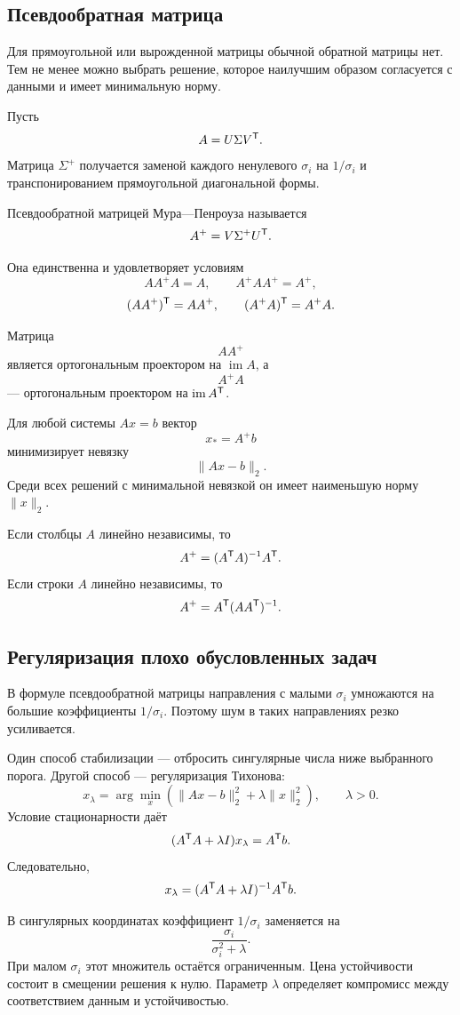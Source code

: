 \subsection{Псевдообратная матрица}

Для прямоугольной или вырожденной матрицы обычной обратной матрицы нет. Тем не менее можно выбрать решение, которое наилучшим образом согласуется с данными и имеет минимальную норму.

Пусть
\[
A=U\Sigma V^{\mathsf{T}}.
\]
Матрица \(\Sigma^+\) получается заменой каждого ненулевого \(\sigma_i\) на \(1/\sigma_i\) и транспонированием прямоугольной диагональной формы.

\begin{definition}
Псевдообратной матрицей Мура---Пенроуза называется
\[
A^+=V\Sigma^+U^{\mathsf{T}}.
\]
\end{definition}

Она единственна и удовлетворяет условиям
\[
AA^+A=A,
\qquad
A^+AA^+=A^+,
\]
\[
(AA^+)^{\mathsf{T}}=AA^+,
\qquad
(A^+A)^{\mathsf{T}}=A^+A.
\]

Матрица
\[
AA^+
\]
является ортогональным проектором на \(\operatorname{im}A\), а
\[
A^+A
\]
--- ортогональным проектором на \(\operatorname{im}A^{\mathsf{T}}\).

Для любой системы \(Ax=b\) вектор
\[
x_*=A^+b
\]
минимизирует невязку
\[
\|Ax-b\|_2.
\]
Среди всех решений с минимальной невязкой он имеет наименьшую норму \(\|x\|_2\).

Если столбцы \(A\) линейно независимы, то
\[
A^+=(A^{\mathsf{T}}A)^{-1}A^{\mathsf{T}}.
\]
Если строки \(A\) линейно независимы, то
\[
A^+=A^{\mathsf{T}}(AA^{\mathsf{T}})^{-1}.
\]

\subsection{Регуляризация плохо обусловленных задач}

В формуле псевдообратной матрицы направления с малыми \(\sigma_i\) умножаются на большие коэффициенты \(1/\sigma_i\). Поэтому шум в таких направлениях резко усиливается.

Один способ стабилизации --- отбросить сингулярные числа ниже выбранного порога. Другой способ --- регуляризация Тихонова:
\[
x_\lambda
=
\arg\min_x
\left(
\|Ax-b\|_2^2+\lambda\|x\|_2^2
\right),
\qquad
\lambda>0.
\]
Условие стационарности даёт
\[
(A^{\mathsf{T}}A+\lambda I)x_\lambda
=
A^{\mathsf{T}}b.
\]
Следовательно,
\[
x_\lambda
=
(A^{\mathsf{T}}A+\lambda I)^{-1}A^{\mathsf{T}}b.
\]

В сингулярных координатах коэффициент \(1/\sigma_i\) заменяется на
\[
\frac{\sigma_i}{\sigma_i^2+\lambda}.
\]
При малом \(\sigma_i\) этот множитель остаётся ограниченным. Цена устойчивости состоит в смещении решения к нулю. Параметр \(\lambda\) определяет компромисс между соответствием данным и устойчивостью.

